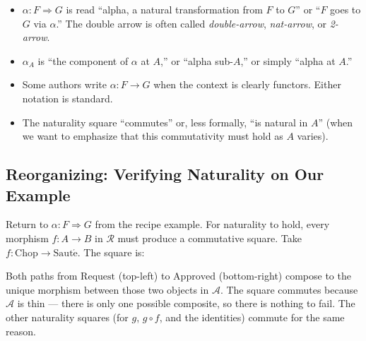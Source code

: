 \begin{howtosay}
\begin{itemize}
  \item $\alpha : F \Rightarrow G$ is read ``alpha, a natural transformation
        from $F$ to $G$'' or ``$F$ goes to $G$ via $\alpha$.'' The double
        arrow is often called \emph{double-arrow}, \emph{nat-arrow}, or
        \emph{2-arrow}.
  \item $\alpha_A$ is ``the component of $\alpha$ at $A$,'' or
        ``alpha sub-$A$,'' or simply ``alpha at $A$.''
  \item Some authors write $\alpha : F \to G$ when the context is clearly
        functors. Either notation is standard.
  \item The naturality square ``commutes'' or, less formally, ``is natural
        in $A$'' (when we want to emphasize that this commutativity must hold
        as $A$ varies).
\end{itemize}
\end{howtosay}

\subsection{Reorganizing: Verifying Naturality on Our Example}

Return to $\alpha : F \Rightarrow G$ from the recipe example. For naturality
to hold, every morphism $f : A \to B$ in $\mathcal{R}$ must produce a
commutative square. Take $f : \mathrm{Chop} \to \mathrm{Saut\acute{e}}$.
The square is:
\begin{center}
\end{center}
Both paths from $\mathrm{Request}$ (top-left) to $\mathrm{Approved}$
(bottom-right) compose to the unique morphism between those two objects in
$\mathcal{A}$. The square commutes because $\mathcal{A}$ is thin --- there
is only one possible composite, so there is nothing to fail. The other
naturality squares (for $g$, $g \circ f$, and the identities) commute for
the same reason.

